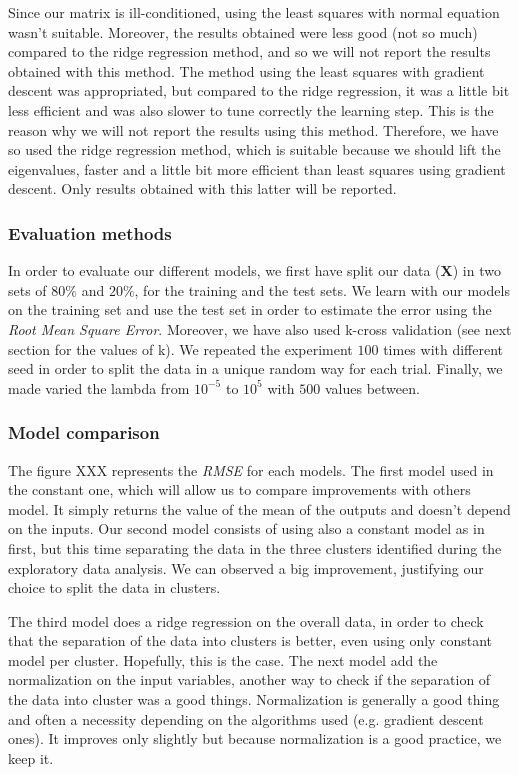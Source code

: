 \documentclass{article} %
\begin{document}
Since our matrix is ill-conditioned, using the least squares with normal equation wasn't suitable. Moreover, the results obtained were less good (not so much) compared to the ridge regression method, and so we will not report the results obtained with this method. The method using the least squares with gradient descent was appropriated, but compared to the ridge regression, it was a little bit less efficient and was also slower to tune correctly the learning step. This is the reason why we will not report the results using this method. Therefore, we have so used the ridge regression method, which is suitable because we should lift the eigenvalues, faster and a little bit more efficient than least squares using gradient descent. Only results obtained with this latter will be reported.

\subsubsection{Evaluation methods}

In order to evaluate our different models, we first have split our data ($\mathbf{X}$) in two sets of $80\%$ and $20\%$, for the training and the test sets. We learn with our models on the training set and use the test set in order to estimate the error using the \textit{Root Mean Square Error}. Moreover, we have also used k-cross validation (see next section for the values of k). We repeated the experiment $100$ times with different seed in order to split the data in a unique random way for each trial. Finally, we made varied the lambda from $10^{-5}$ to $10^{5}$ with $500$ values between.

\subsubsection{Model comparison}

The figure XXX represents the \textit{RMSE} for each models. The first model used in the constant one, which will allow us to compare improvements with others model. It simply returns the value of the mean of the outputs and doesn't depend on the inputs. Our second model consists of using also a constant model as in first, but this time separating the data in the three clusters identified during the exploratory data analysis. We can observed a big improvement, justifying our choice to split the data in clusters. 

The third model does a ridge regression on the overall data, in order to check that the separation of the data into clusters is better, even using only constant model per cluster. Hopefully, this is the case. The next model add the normalization on the input variables, another way to check if the separation of the data into cluster was a good things. Normalization is generally a good thing and often a necessity depending on the algorithms used (e.g. gradient descent ones). It improves only slightly but because normalization is a good practice, we keep it.
\end{document}
